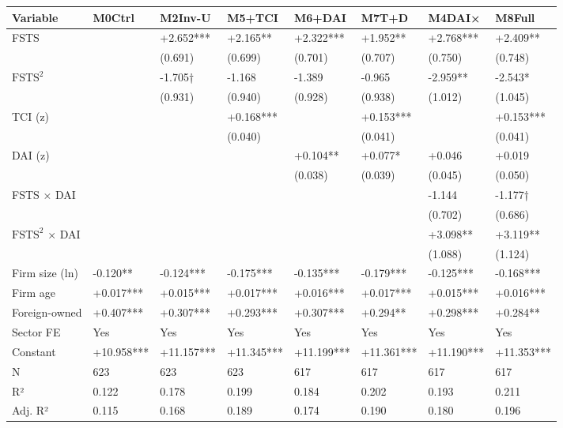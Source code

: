 \documentclass[12pt,a4paper]{article}
\begin{document}
\begin{longtable}[]{@{}llllllll@{}}
\toprule\noalign{}
Variable & M0Ctrl & M2Inv-U & M5+TCI & M6+DAI & M7T+D & M4DAI× &
M8Full \\
\midrule\noalign{}
\endhead
\bottomrule\noalign{}
\endlastfoot
FSTS & & +2.652*** & +2.165** & +2.322*** & +1.952** & +2.768*** &
+2.409** \\
& & (0.691) & (0.699) & (0.701) & (0.707) & (0.750) & (0.748) \\
\(\mathrm{FSTS}^2\) & & -1.705† & -1.168 & -1.389 & -0.965 & -2.959** &
-2.543* \\
& & (0.931) & (0.940) & (0.928) & (0.938) & (1.012) & (1.045) \\
TCI (z) & & & +0.168*** & & +0.153*** & & +0.153*** \\
& & & (0.040) & & (0.041) & & (0.041) \\
DAI (z) & & & & +0.104** & +0.077* & +0.046 & +0.019 \\
& & & & (0.038) & (0.039) & (0.045) & (0.050) \\
FSTS × DAI & & & & & & -1.144 & -1.177† \\
& & & & & & (0.702) & (0.686) \\
\(\mathrm{FSTS}^2\) × DAI & & & & & & +3.098** & +3.119** \\
& & & & & & (1.088) & (1.124) \\
Firm size (ln) & -0.120** & -0.124*** & -0.175*** & -0.135*** &
-0.179*** & -0.125*** & -0.168*** \\
Firm age & +0.017*** & +0.015*** & +0.017*** & +0.016*** & +0.017*** &
+0.015*** & +0.016*** \\
Foreign-owned & +0.407*** & +0.307*** & +0.293*** & +0.307*** & +0.294**
& +0.298*** & +0.284** \\
Sector FE & Yes & Yes & Yes & Yes & Yes & Yes & Yes \\
Constant & +10.958*** & +11.157*** & +11.345*** & +11.199*** &
+11.361*** & +11.190*** & +11.353*** \\
N & 623 & 623 & 623 & 617 & 617 & 617 & 617 \\
R² & 0.122 & 0.178 & 0.199 & 0.184 & 0.202 & 0.193 & 0.211 \\
Adj. R² & 0.115 & 0.168 & 0.189 & 0.174 & 0.190 & 0.180 & 0.196 \\
\end{longtable}
\end{document}
